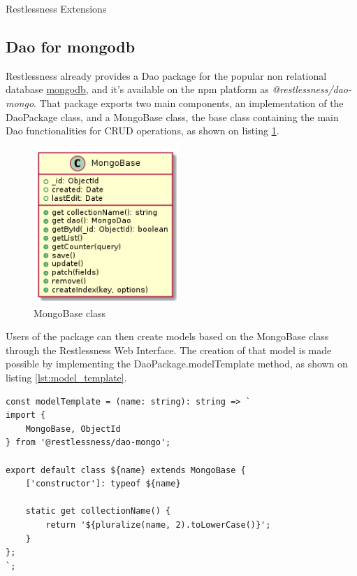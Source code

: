 \begin{chapter}{Restlessness Extensions}
    \subsection{Dao for mongodb}
    Restlessness already provides a Dao package for the popular non relational
    database \href{https://www.mongodb.com/}{mongodb}, and it's available on the
    npm platform as \mbox{\textit{@restlessness/dao-mongo}}.
    That package exports two main components, an implementation of the DaoPackage
    class, and a MongoBase class, the base class containing the main Dao
    functionalities for CRUD operations, as shown on listing \ref{fig:mongobase}.

    \begin{figure}
        \centering
        \includegraphics[width=5.5cm]{source/diagrams/mongobase_class.png}
        \caption{MongoBase class}
        \label{fig:mongobase}
    \end{figure}

    Users of the package can then create models based on the MongoBase class through
    the Restlessness Web Interface.
    The creation of that model is made possible by implementing the DaoPackage.modelTemplate
    method, as shown on listing \ref{lst:model_template}.

    \bigskip
    \begin{lstlisting}[caption=modelTemplate function definition, label={lst:model_template}]
const modelTemplate = (name: string): string => `
import {
    MongoBase, ObjectId
} from '@restlessness/dao-mongo';

export default class ${name} extends MongoBase {
    ['constructor']: typeof ${name}

    static get collectionName() {
        return '${pluralize(name, 2).toLowerCase()}';
    }
};
`;
    \end{lstlisting}


\end{chapter}
